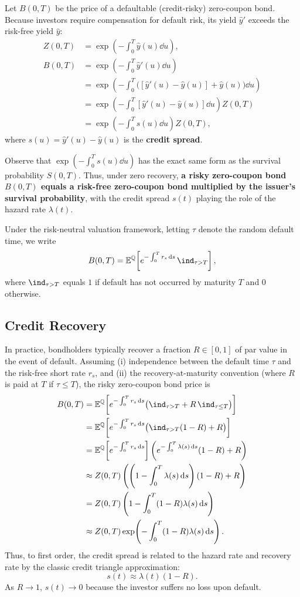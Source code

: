 Let $B(0, T)$ be the price of a defaultable (credit-risky) zero-coupon bond. Because investors require compensation for default risk, its yield $\hat{y}'$ exceeds the risk-free yield $\hat{y}$:
\begin{align*}
Z(0, T) &= \exp\!\left(-\int_0^T \hat{y}(u)\dd u\right), \\
B(0, T) &= \exp\!\left(-\int_0^T \hat{y}'(u)\dd u\right) \\
&= \exp\!\left(-\int_0^T \bigl([\hat{y}'(u) - \hat{y}(u)] + \hat{y}(u)\bigr)\dd u\right) \\
&= \exp\!\left(-\int_0^T [\hat{y}'(u) - \hat{y}(u)]\dd u\right) Z(0, T) \\
&= \exp\!\left(-\int_0^T s(u)\dd u\right) Z(0, T),
\end{align*}
where $s(u) = \hat{y}'(u) - \hat{y}(u)$ is the \textbf{credit spread}.

Observe that $\exp(-\int_0^T s(u)\dd u)$ has the exact same form as the survival probability $S(0, T)$. Thus, under zero recovery, \textbf{a risky zero-coupon bond $B(0, T)$ equals a risk-free zero-coupon bond multiplied by the issuer's survival probability}, with the credit spread $s(t)$ playing the role of the hazard rate $\lambda(t)$.

Under the risk-neutral valuation framework, letting $\tau$ denote the random default time, we write
\[
B(0, T) = \E^{\Q}\!\left[e^{-\int_0^T r_s\dd s}\,\ind_{\tau > T}\right],
\]
where $\ind_{\tau > T}$ equals $1$ if default has not occurred by maturity $T$ and $0$ otherwise.

\subsection*{Credit Recovery}
In practice, bondholders typically recover a fraction $R \in [0, 1]$ of par value in the event of default. Assuming (i) independence between the default time $\tau$ and the risk-free short rate $r_s$, and (ii) the recovery-at-maturity convention (where $R$ is paid at $T$ if $\tau \leq T$), the risky zero-coupon bond price is
\begin{align*}
B(0, T) &= \E^{\Q}\!\left[e^{-\int_0^T r_s\dd s}\bigl(\ind_{\tau > T} + R\,\ind_{\tau \leq T}\bigr)\right] \\
&= \E^{\Q}\!\left[e^{-\int_0^T r_s\dd s}\bigl(\ind_{\tau > T}(1 - R) + R\bigr)\right] \\
&= \E^{\Q}\!\left[e^{-\int_0^T r_s\dd s}\right] \left(e^{-\int_0^T \lambda(s)\dd s}(1 - R) + R\right) \\
&\approx Z(0, T)\left(\left(1 - \int_0^T \lambda(s)\dd s\right)(1 - R) + R\right) \\
&= Z(0, T)\left(1 - \int_0^T (1 - R)\lambda(s)\dd s\right) \\
&\approx Z(0, T)\exp\!\left(-\int_0^T (1 - R)\lambda(s)\dd s\right).
\end{align*}
Thus, to first order, the credit spread is related to the hazard rate and recovery rate by the classic credit triangle approximation:
\[
s(t) \approx \lambda(t)(1 - R).
\]
As $R \to 1$, $s(t) \to 0$ because the investor suffers no loss upon default.

